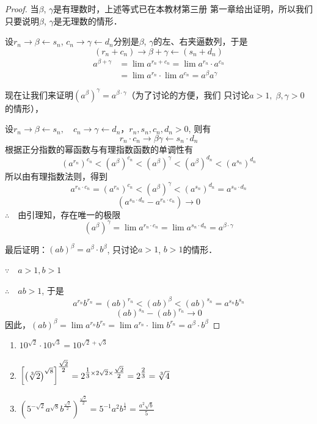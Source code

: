 \begin{proof}
当$\beta$, $\gamma$是有理数时，上述等式已在本教材第三册
第一章给出证明，所以我们只要说明$\beta$, $\gamma$是无理数的情形．

设$r_n\to\beta\leftarrow s_n$, $c_n\to\gamma\leftarrow d_n$分别是$\beta$, $\gamma$的左、右夹逼数列，于是
\[(r_n+c_n)\to \beta+\gamma \leftarrow (s_n+d_n)\]
\[\begin{split}
  a^{\beta+\gamma}&=\lim a^{r_n+c_n}=\lim a^{r_n}\cdot a^{c_n}\\
  &=\lim a^{r_n}\cdot \lim a^{c_n}=a^{\beta}a^{\gamma}
\end{split}\]

现在让我们来证明$(a^{\beta})^{\gamma}=a^{\beta\cdot \gamma}$（为了讨论的方便，我们
只讨论$a>1,\; \beta ,\gamma>0$的情形），

设$r_n\to \beta \leftarrow s_n,\quad c_n\to \gamma\leftarrow d_n$，$r_n, s_n,c_n,d_n>0$, 则有
\[r_n\cdot c_n\to \beta\gamma\leftarrow s_n\cdot d_n\]
根据正分指数的幂函数与有理指数函数的单调性有
\[(a^{r_n})^{c_n}<(a^{\beta})^{c_n}<(a^{\beta})^{\gamma}<(a^{\beta})^{d_n}<(a^{s_n})^{d_n}\]
所以由有理指数法则，得到
\[a^{r_n\cdot c_n}=(a^{r_n})^{c_n}<(a^{\beta})^{\gamma}<(a^{s_n})^{d_n}=a^{s_n\cdot d_n}\]
\[\left(a^{s_n\cdot d_n}-a^{r_n\cdot c_n}\right)\to 0\]
$\therefore\quad $由引理知，存在唯一的极限
\[(a^{\beta})^{\gamma}=\lim a^{r_n\cdot c_n} =\lim a^{s_n\cdot d_n} =a^{\beta\cdot \gamma}\]

最后证明：$(ab)^{\beta}=a^{\beta}\cdot b^{\beta}$, 只讨论$a>1$, $b>1$的情形．

$\because\quad a>1,b>1$

$\therefore\quad ab>1$, 于是
\[a^{r_n}b^{r_n}=(ab)^{r_n}<(ab)^{\beta}<(ab)^{s_n}=a^{s_n}b^{s_n}\]
\[(ab)^{s_n}-(ab)^{r_n}\to 0\]
因此，$(ab)^{\beta}=\lim a^{r_n}b^{r_n} = \lim a^{r_n}\cdot \lim b^{r_n}=a^{\beta}\cdot b^{\beta}$
\end{proof}

\begin{example}
  \begin{enumerate}
    \item $10^{\sqrt{2}}\cdot 10^{\sqrt{3}}=10^{\sqrt{2}+\sqrt{3}}$
    \item  $\left[\left(\sqrt[3]{2}\right)^{\sqrt{8}}\right]^{\tfrac{\sqrt{2}}{2}}=2^{\tfrac{1}{3}\times 2\sqrt{2}\times\tfrac{\sqrt{2}}{2}}=2^{\tfrac{2}{3}}=\sqrt[3]{4}$
    \item $\left(5^{-\sqrt{2}}a^{\sqrt{8}}b^{\tfrac{\sqrt{2}}{2}}\right)^{\tfrac{\sqrt{2}}{2}}=5^{-1}a^{2}b^{\tfrac{1}{2}} =\frac{a^2\sqrt{b}}{5} $
  \end{enumerate}
\end{example}

